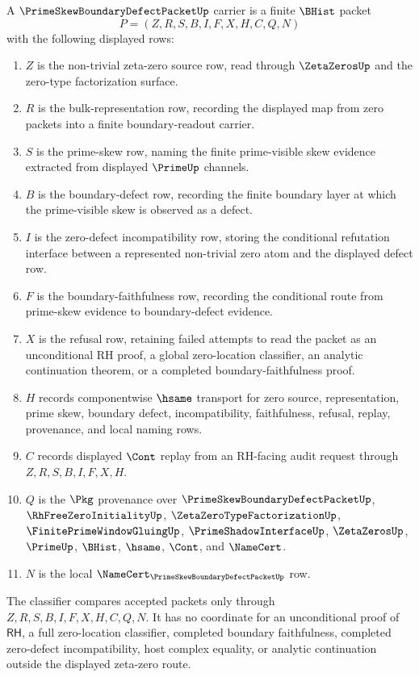 \begin{definition}
\label{def:prime-skew-boundary-defect-packet-carrier}
A $\PrimeSkewBoundaryDefectPacketUp$ carrier is a finite $\BHist$ packet
$$
P=(Z,R,S,B,I,F,X,H,C,Q,N)
$$
with the following displayed rows:
\begin{enumerate}
\item $Z$ is the non-trivial zeta-zero source row, read through $\ZetaZerosUp$ and the zero-type factorization surface.
\item $R$ is the bulk-representation row, recording the displayed map from zero packets into a finite boundary-readout carrier.
\item $S$ is the prime-skew row, naming the finite prime-visible skew evidence extracted from displayed $\PrimeUp$ channels.
\item $B$ is the boundary-defect row, recording the finite boundary layer at which the prime-visible skew is observed as a defect.
\item $I$ is the zero-defect incompatibility row, storing the conditional refutation interface between a represented non-trivial zero atom and the displayed defect row.
\item $F$ is the boundary-faithfulness row, recording the conditional route from prime-skew evidence to boundary-defect evidence.
\item $X$ is the refusal row, retaining failed attempts to read the packet as an unconditional RH proof, a global zero-location classifier, an analytic continuation theorem, or a completed boundary-faithfulness proof.
\item $H$ records componentwise $\hsame$ transport for zero source, representation, prime skew, boundary defect, incompatibility, faithfulness, refusal, replay, provenance, and local naming rows.
\item $C$ records displayed $\Cont$ replay from an RH-facing audit request through $Z,R,S,B,I,F,X,H$.
\item $Q$ is the $\Pkg$ provenance over $\PrimeSkewBoundaryDefectPacketUp$, $\RhFreeZeroInitialityUp$, $\ZetaZeroTypeFactorizationUp$, $\FinitePrimeWindowGluingUp$, $\PrimeShadowInterfaceUp$, $\ZetaZerosUp$, $\PrimeUp$, $\BHist$, $\hsame$, $\Cont$, and $\NameCert$.
\item $N$ is the local $\NameCert_{\PrimeSkewBoundaryDefectPacketUp}$ row.
\end{enumerate}
The classifier compares accepted packets only through $Z,R,S,B,I,F,X,H,C,Q,N$. It has no coordinate for an unconditional proof of $\mathsf{RH}$, a full zero-location classifier, completed boundary faithfulness, completed zero-defect incompatibility, host complex equality, or analytic continuation outside the displayed zeta-zero route.
\end{definition}

